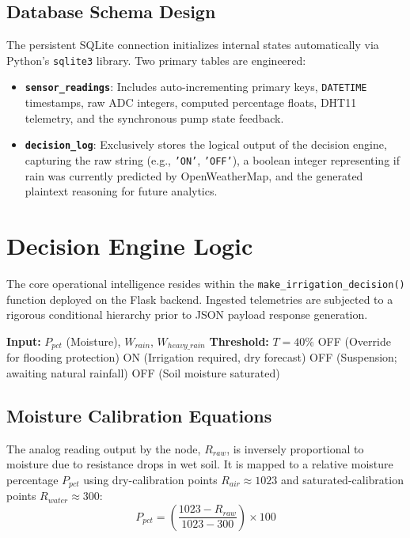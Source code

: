 \documentclass[conference]{IEEEtran}
\begin{document}
\subsection{Database Schema Design}
The persistent SQLite connection initializes internal states automatically via Python's \texttt{sqlite3} library. Two primary tables are engineered:
\begin{itemize}
    \item \textbf{\texttt{sensor\_readings}}: Includes auto-incrementing primary keys, \texttt{DATETIME} timestamps, raw ADC integers, computed percentage floats, DHT11 telemetry, and the synchronous pump state feedback.
    \item \textbf{\texttt{decision\_log}}: Exclusively stores the logical output of the decision engine, capturing the raw string (e.g., \texttt{'ON'}, \texttt{'OFF'}), a boolean integer representing if rain was currently predicted by OpenWeatherMap, and the generated plaintext reasoning for future analytics.
\end{itemize}

\section{Decision Engine Logic}

The core operational intelligence resides within the \texttt{make\_irrigation\_decision()} function deployed on the Flask backend. Ingested telemetries are subjected to a rigorous conditional hierarchy prior to JSON payload response generation.

\begin{algorithm}
\caption{Predictive Irrigation Decision Logic}
\begin{algorithmic}[1]
\STATE \textbf{Input:} $P_{pct}$ (Moisture), $W_{rain}$, $W_{heavy\_rain}$
\STATE \textbf{Threshold:} $T = 40\%$
    \STATE \RETURN OFF (Override for flooding protection)
    \STATE \RETURN ON (Irrigation required, dry forecast)
    \STATE \RETURN OFF (Suspension; awaiting natural rainfall)
\ELSE
    \STATE \RETURN OFF (Soil moisture saturated)
\ENDIF
\end{algorithmic}
\end{algorithm}

\subsection{Moisture Calibration Equations}
The analog reading output by the node, $R_{raw}$, is inversely proportional to moisture due to resistance drops in wet soil. It is mapped to a relative moisture percentage $P_{pct}$ using dry-calibration points $R_{air} \approx 1023$ and saturated-calibration points $R_{water} \approx 300$:
\begin{equation}
P_{pct} = \left(\frac{1023 - R_{raw}}{1023 - 300}\right) \times 100
\end{equation}
\end{document}
